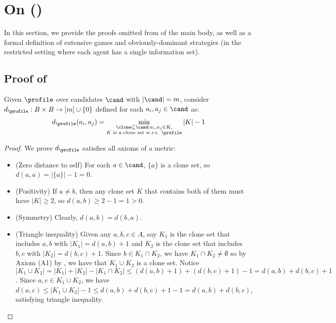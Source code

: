 \section{On  ()}

In this section, we provide the proofs omitted from  of the main body, as well as a formal definition of extensive games and obviously-dominant strategies (in the restricted setting where each agent has a single information set).

\subsection{Proof of }
Given $\profile$ over candidates $\cand$ with $|\cand|=m$, consider $d_{\profile}: B \times B \rightarrow [m] \cup \{0\}$ defined for each $a_i,a_j \in \cand$ as:
\begin{align*}
    d_{\profile}(a_i,a_j)= \min_{\substack{{\clone \subseteq \cand: a_i,a_j \in K,}\\{K\text{ is a clone set w.r.t. }\profile}}} |K| -1
\end{align*}

\clonemetric*

\begin{proof} We prove $d_{\profile}$ satisfies all axioms of a metric:
    \begin{itemize}
    \item (Zero distance to self) For each $a \in \cand$, $\{a\}$ is a clone set, so $d(a,a)=|\{a\}|-1=0$.
    \item (Positivity) If $a\neq b$, then any clone set $K$ that contains both of them must have $|K|\geq 2$, so $d(a,b) \geq 2-1=1>0$.
    \item (Symmetry) Clearly, $d(a,b)=d(b,a)$.
    \item (Triangle inequality) Given any $a,b,c \in A$, say $K_1$ is the clone set that includes $a,b$ with $|K_1|=d(a,b)+1$ and $K_2$ is the clone set that includes $b,c$ with $|K_2|=d(b,c)+1$. Since $b \in K_1 \cap K_2$, we have $K_1 \cap K_2 \neq \emptyset$ so by Axiom (A1) by \citet{Elkind10:Clone}, we have that $K_1 \cup K_2$ is a clone set. Notice $|K_1 \cup K_2|= |K_1|+|K_2| - |K_1 \cap K_2| \leq (d(a,b)+1) + (d(b,c)+1) - 1=d(a,b)+d(b,c)+1$. Since $a,c \in K_1 \cup K_2$, we have $d(a,c) \leq |K_1 \cup K_2|-1 \leq d(a,b)+d(b,c)+1-1=d(a,b)+d(b,c)$, satisfying triangle inequality. 
\end{itemize}
\end{proof}
